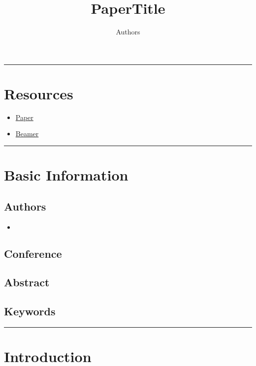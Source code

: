 \documentclass[letterpaper,10pt]{article}
\title{\textbf{PaperTitle}}
\author{Authors}
\begin{document}
	
\maketitle

\tableofcontents

\begin{center}\rule{\textwidth}{1pt}\end{center}
\section{Resources}

\begin{itemize}
	\item \href{./paper.pdf}{Paper}
	\item \href{./beamer.pdf}{Beamer}
\end{itemize}

\begin{center}\rule{\textwidth}{1pt}\end{center}
\section{Basic Information}

\subsection{Authors}
\begin{itemize}
	\item 
\end{itemize}

\subsection{Conference}


\subsection{Abstract}


\subsection{Keywords}


\begin{center}\rule{\textwidth}{1pt}\end{center}
\section{Introduction}
\end{document}
